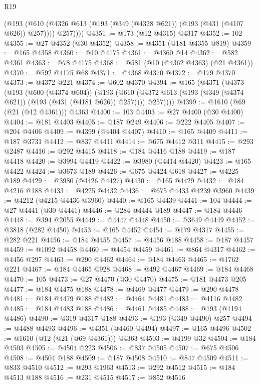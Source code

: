 \begin{lexlean}{R19}
\begin{coremodule}
          (@193
            (@610 (@4326 @613 (@193 (@349 (@4328 @621)) (@193 (@431 (@4107 @626)) @257))))
            @257))))
@4351 := @173 (@12 @4315) @4317
@4352 := 102
@4355 := @27 @4352 (@30 @4352)
@4358 := @4351 (@181 @4355 @819)
@4359 := @165 @4358
@4360 := @10 @4175
@4361 := @4360 @14
@4362 := @582 @4361
@4363 := @78 @4175
@4368 := @581 (@10 (@4362 @4363) (@21 @4361))
@4370 := @592 @4175 @68
@4371 := @4368 @4370
@4372 := @179 @4370
@4373 := @4372 @221
@4374 := @602 @4370
@4394 := @165
    (@4371
      (@4373
        (@193
          (@600 (@4374 @604))
          (@193
            (@610 (@4372 @613 (@193 (@349 (@4374 @621)) (@193 (@431 (@4181 @626)) @257))))
            @257))))
@4399 := @1610 (@69 (@21 (@12 @4361))) @4363
@4400 := 103
@4403 := @27 @4400 (@30 @4400)
@4404 := @181 @4403
@4405 := @187 @249
@4406 := @222 @4405
@4407 := @204 @4406
@4409 := @4399 (@4404 @4407)
@4410 := @165 @4409
@4411 := @187 @3731
@4412 := @837 @4411
@4414 := @675 @4412 @311
@4415 := @293 @2487
@4416 := @292 @4415
@4418 := @184 @4416 @188
@4419 := @187 @4418
@4420 := @3994 @4419
@4422 := @3980 (@4414 @4420)
@4423 := @165 @4422
@4424 := @3673 @189
@4426 := @675 @4424 @618
@4427 := @4225 @189
@4429 := @3980 (@4426 @4427)
@4430 := @165 @4429
@4432 := @184 @4216 @188
@4433 := @4225 @4432
@4436 := @675 @4433 @4239 @3960
@4439 := @4212 (@4215 @4436 @3960)
@4440 := @165 @4439
@4441 := 104
@4444 := @27 @4441 (@30 @4441)
@4446 := @284 @4444 @189
@4447 := @184 @4446
@4448 := @394 @2055
@4449 := @4447 @4448
@4450 := @3649 @4449
@4452 := @3818 (@282 @4450)
@4453 := @165 @4452
@4454 := @179 @4317
@4455 := @282 @221
@4456 := @184 @4455
@4457 := @4456 @188
@4458 := @187 @4457
@4459 := @1092 @4458
@4460 := @4454 @4459
@4461 := @864 @4317
@4462 := @4456 @297
@4463 := @290 @4462
@4464 := @184 @4463
@4465 := @1762 @221
@4467 := @184 @4465 @928
@4468 := @492 @4467
@4469 := @184 @4468
@4470 := 105
@4473 := @27 @4470 (@30 @4470)
@4475 := @181 @4473 @205
@4477 := @184 @4475 @188
@4478 := @4469 @4477
@4479 := @290 @4478
@4481 := @184 @4479 @188
@4482 := @4464 @4481
@4483 := @4116 @4482
@4485 := @184 @4483 @188
@4486 := @4461 @4485
@4488 := @193 (@1194 @4486)
@4490 := @319 @4317 @188
@4493 := @193 (@349 @4490) @257
@4494 := @4488 @4493
@4496 := @4351 (@4460 @4494)
@4497 := @165 @4496
@4502 := @1610 (@12 (@21 (@69 @4361))) @4363
@4503 := @4199 @32
@4504 := @184 @4503
@4505 := @4504 @223
@4506 := @837 @4505
@4507 := @675 @4506
@4508 := @4504 @188
@4509 := @187 @4508
@4510 := @847 @4509
@4511 := @833 @4510
@4512 := @293 @1963
@4513 := @292 @4512
@4515 := @184 @4513 @188
@4516 := @231 @4515
@4517 := @852 @4516

\end{coremodule}
\end{lexlean}
